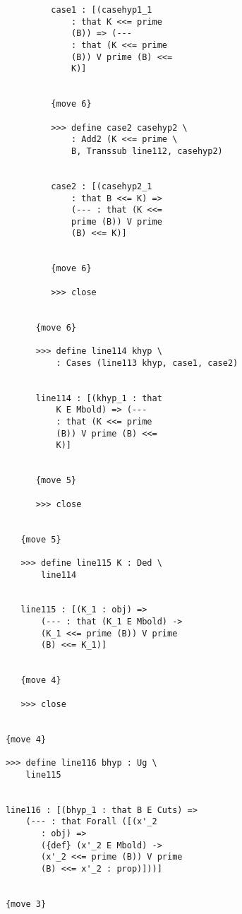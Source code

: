 \documentclass[12pt]{article}
\begin{document}
\begin{verbatim}
                     case1 : [(casehyp1_1 
                         : that K <<= prime 
                         (B)) => (--- 
                         : that (K <<= prime 
                         (B)) V prime (B) <<= 
                         K)]


                     {move 6}

                     >>> define case2 casehyp2 \
                         : Add2 (K <<= prime \
                         B, Transsub line112, casehyp2)


                     case2 : [(casehyp2_1 
                         : that B <<= K) => 
                         (--- : that (K <<= 
                         prime (B)) V prime 
                         (B) <<= K)]


                     {move 6}

                     >>> close


                  {move 6}

                  >>> define line114 khyp \
                      : Cases (line113 khyp, case1, case2)


                  line114 : [(khyp_1 : that 
                      K E Mbold) => (--- 
                      : that (K <<= prime 
                      (B)) V prime (B) <<= 
                      K)]


                  {move 5}

                  >>> close


               {move 5}

               >>> define line115 K : Ded \
                   line114


               line115 : [(K_1 : obj) => 
                   (--- : that (K_1 E Mbold) -> 
                   (K_1 <<= prime (B)) V prime 
                   (B) <<= K_1)]


               {move 4}

               >>> close


            {move 4}

            >>> define line116 bhyp : Ug \
                line115


            line116 : [(bhyp_1 : that B E Cuts) => 
                (--- : that Forall ([(x'_2 
                   : obj) => 
                   ({def} (x'_2 E Mbold) -> 
                   (x'_2 <<= prime (B)) V prime 
                   (B) <<= x'_2 : prop)]))]


            {move 3}


\end{verbatim}
\end{document}

